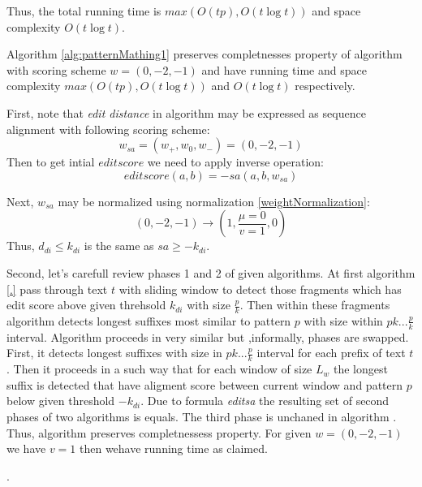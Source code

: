 Thus, the total running time is $max(O(tp),O(t \log t))$ and space complexity $O(t \log t)$. 


\begin{theorem}
Algorithm \ref{alg:patternMathing1} preserves completnesses property of algorithm \cite{luciv2019interactive} with scoring scheme  $w = (0,-2,-1)$ and have running time and space complexity $max(O(tp),O(t \log t))$ and $O(t \log t)$  respectively.
\end{theorem}

First, note  that \emph{edit distance} in algorithm \cite{.} may be expressed as sequence alignment  with following scoring scheme: 
\begin{displaymath}
w_{sa}=(w_{+},w_{0},w_{-}) = (0,-2,-1)
\end{displaymath}
Then to get intial $edit score$ we need to apply inverse operation:
\begin{equation}\label{editsa}
editscore(a,b) = -sa(a,b,w_{sa}) 
\end{equation}

Next, $w_{sa}$ may be normalized using normalization \ref{weightNormalization}:
\begin{displaymath}
(0, -2, -1) \rightarrow (1,\frac{\mu=0}{v=1}, 0)
\end{displaymath}
Thus, $d_{di} \leq k_{di}$ is the same as $sa \geq -k_{di}$.

Second, let's carefull review phases 1 and 2 of given algorithms.
At first algorithm \ref{.} pass through text $t$ with sliding window to detect those fragments which has edit score above given threhsold $k_{di}$ with size $\frac{p}{k}$.
Then within these fragments algorithm detects longest suffixes most similar to pattern $p$ with size within  $pk...\frac{p}{k}$ interval.
Algorithm \cite{.} proceeds in very similar but ,informally, phases are swapped.
First, it detects longest suffixes with size in $pk...\frac{p}{k}$ interval for each prefix of text $t$.
Then it proceeds in a such way that for each window of size $L_{w}$ the longest suffix is detected that have aligment score between current window and pattern $p$ below given threshold $-k_{di}$.
Due to formula  \emph{editsa} the resulting set of second phases of two algorithms is equals.
The third phase is unchaned in algorithm \cite{.}.
Thus, algorithm \cite{}  preserves  completnessess property.
For given $w = (0,-2,-1)$ we have $v=1$ then wehave running time as claimed.


%
 .



